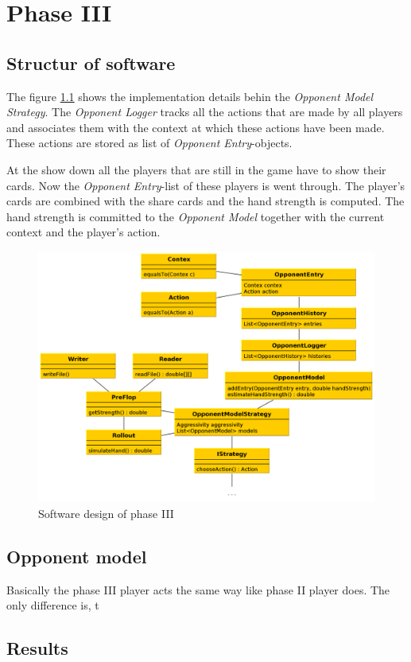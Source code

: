 \chapter{Phase III}

\section{Structur of software}
The figure \ref{fig:phase3} shows the implementation details behin the \emph{Opponent Model Strategy}. The \emph{Opponent Logger} tracks all the actions that are made by all players and associates them with the context at which these actions have been made. These actions are stored as list of \emph{Opponent Entry}-objects. 

At the show down all the players that are still in the game have to show their cards. Now the \emph{Opponent Entry}-list of these players is went through. The player's cards are combined with the share cards and the hand strength is computed. The hand strength is committed to the \emph{Opponent Model} together with the current context and the player's action.

\begin{figure}[h]
  \centering
  \includegraphics[width=1.0\textwidth]{images/phase3}
  \caption{Software design of phase III}
  \label{fig:phase3}
\end{figure}

\section{Opponent model}
Basically the phase III player acts the same way like phase II player does. The only difference is, t

\section{Results}

